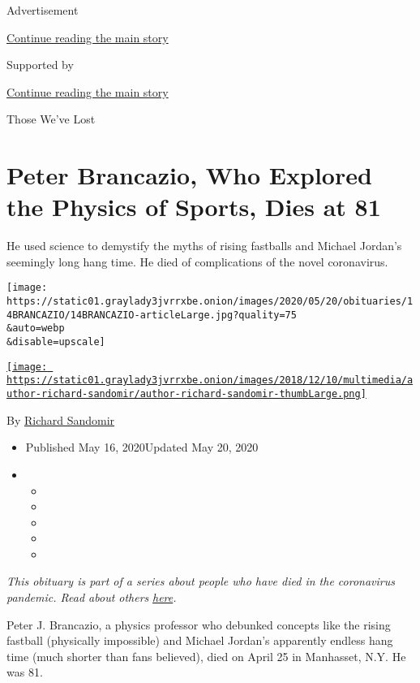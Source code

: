Advertisement

\protect\hyperlink{after-top}{Continue reading the main story}

Supported by

\protect\hyperlink{after-sponsor}{Continue reading the main story}

Those We've Lost

\hypertarget{peter-brancazio-who-explored-the-physics-of-sports-dies-at-81}{%
\section{Peter Brancazio, Who Explored the Physics of Sports, Dies at
81}\label{peter-brancazio-who-explored-the-physics-of-sports-dies-at-81}}

He used science to demystify the myths of rising fastballs and Michael
Jordan's seemingly long hang time. He died of complications of the novel
coronavirus.

\texttt{[image: https://static01.graylady3jvrrxbe.onion/images/2020/05/20/obituaries/14BRANCAZIO/14BRANCAZIO-articleLarge.jpg?quality=75\\\&auto=webp\\\&disable=upscale]}

\href{https://www.nytimes3xbfgragh.onion/by/richard-sandomir}{\texttt{[image: https://static01.graylady3jvrrxbe.onion/images/2018/12/10/multimedia/author-richard-sandomir/author-richard-sandomir-thumbLarge.png]}}

By \href{https://www.nytimes3xbfgragh.onion/by/richard-sandomir}{Richard
Sandomir}

\begin{itemize}
\item
  Published May 16, 2020Updated May 20, 2020
\item
  \begin{itemize}
  \item
  \item
  \item
  \item
  \item
  \end{itemize}
\end{itemize}

\emph{This obituary is part of a series about people who have died in
the coronavirus pandemic. Read about others}
\href{https://www.nytimes3xbfgragh.onion/series/people-who-have-died-of-the-coronavirus}{\emph{here}}\emph{.}

Peter J. Brancazio, a physics professor who debunked concepts like the
rising fastball (physically impossible) and Michael Jordan's apparently
endless hang time (much shorter than fans believed), died on April 25 in
Manhasset, N.Y. He was 81.

